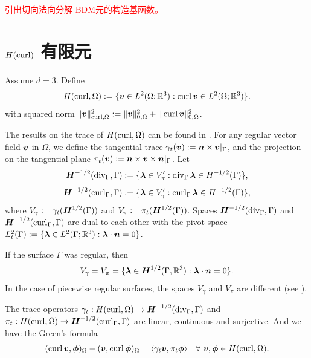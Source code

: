 \textcolor{red}{引出切向法向分解 BDM元的构造基函数。}







\section{$H(\operatorname{curl})$ 有限元}

Assume $d=3$.
Define
\[
H(\operatorname{curl},\Omega):=\{\boldsymbol v\in L^2(\Omega;\mathbb R^3): \operatorname{curl}\boldsymbol v\in L^2(\Omega;\mathbb R^3)\}.
\]
with squared  norm $\|\boldsymbol v\|_{\operatorname{curl}, \Omega}^2:=\|\boldsymbol v\|_{0, \Omega}^2+\|\operatorname{curl}\boldsymbol v\|_{0, \Omega}^2$.

The results on the trace of $H(\operatorname{curl},\Omega)$ can be found in \cite{BuffaCostabelSheen2002,BuffaCiarlet2001,BuffaCiarlet2001a}.
 For any regular vector field $\boldsymbol v$ in $\Omega$, we define the tangential trace $\gamma_{t}(\boldsymbol v):=\boldsymbol n\times \boldsymbol v|_{\Gamma}$, and the projection on the tangential plane $\pi_{t}(\boldsymbol v):=\boldsymbol n\times\boldsymbol v\times  \boldsymbol n|_{\Gamma}$. Let
 \[
 \boldsymbol H^{-1/2}(\operatorname{div}_{\Gamma}, \Gamma):=\{\boldsymbol\lambda\in V_{\pi}': \operatorname{div}_{\Gamma}\boldsymbol\lambda\in H^{-1/2}(\Gamma)\},
 \]
 \[
 \boldsymbol H^{-1/2}(\operatorname{curl}_{\Gamma}, \Gamma):=\{\boldsymbol\lambda\in V_{\gamma}': \operatorname{curl}_{\Gamma}\boldsymbol\lambda\in H^{-1/2}(\Gamma)\},
 \]
 where $V_{\gamma}:=\gamma_{t}(\boldsymbol H^{1/2}(\Gamma))$ and $V_{\pi}:=\pi_{t}(\boldsymbol H^{1/2}(\Gamma))$.
Spaces $ \boldsymbol H^{-1/2}(\operatorname{div}_{\Gamma}, \Gamma)$ and $ \boldsymbol H^{-1/2}(\operatorname{curl}_{\Gamma}, \Gamma)$ are dual to each other with the pivot space $L_t^2(\Gamma):=\{\boldsymbol \lambda\in L^2(\Gamma;\mathbb R^3): \boldsymbol \lambda\cdot\boldsymbol n=0\}$.

If the surface $\Gamma$ was regular, then
\[
V_{\gamma}=V_{\pi}=\{\boldsymbol\lambda\in\boldsymbol H^{1/2}(\Gamma, \mathbb R^3): \boldsymbol\lambda\cdot\boldsymbol n=0\}.
\]
In the case of piecewise regular surfaces, the spaces $V_{\gamma}$ and $V_{\pi}$ are different (see \cite{BuffaCiarlet2001}).

\begin{lemma}
The trace operators $\gamma_{t}:  H(\operatorname{curl},\Omega)\to\boldsymbol H^{-1/2}(\operatorname{div}_{\Gamma}, \Gamma)$ and $\pi_{t}:  H(\operatorname{curl},\Omega)\to\boldsymbol H^{-1/2}(\operatorname{curl}_{\Gamma}, \Gamma)$ are linear, continuous and surjective. And we have the 
Green's formula
\[
(\operatorname{curl}\boldsymbol v, \boldsymbol\phi)_{\Omega} - (\boldsymbol v, \operatorname{curl}\boldsymbol\phi)_{\Omega}=\langle\gamma_t\boldsymbol v, \pi_t\boldsymbol \phi\rangle\quad\forall~\boldsymbol v, \boldsymbol \phi\in H(\operatorname{curl},\Omega).
\]
\end{lemma}

